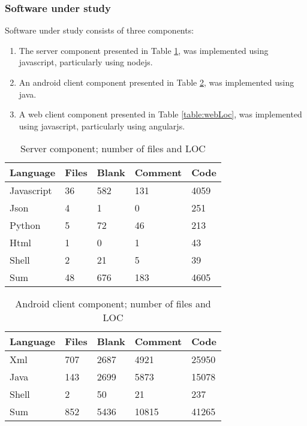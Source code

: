 \documentclass[english,12pt,a4paper,pdftex,sci,utf8]{aaltothesis}
\begin{document}
\subsubsection*{Software under study} \label{software}
Software under study consists of three components:

\begin{enumerate}[label=\textbf{C\arabic*}]
\item The server component presented in Table \ref{table:serverLoc}, was implemented using javascript, particularly using nodejs.

\item An android client component presented in Table \ref{table:androidLoc}, was implemented using java.
    
\item A web client component presented in Table \ref{table:webLoc}, was implemented using javascript, particularly using angularjs.
\end{enumerate}

\begin{table}[ht!]
\centering
\caption{Server component; number of files and LOC}
\label{table:serverLoc}
    \begin{tabular}{ |p{3cm} p{2cm} p{2cm} p{2cm} p{2cm}|  }
     \hline
     Language       &Files  &Blank  &Comment    &Code\\
     \hline
     \hline
     Javascript     &36     &582    &131        &4059\\
     Json           &4      &1      &0          &251\\
     Python         &5      &72     &46         &213\\
     Html           &1      &0      &1          &43\\
     Shell          &2      &21     &5          &39\\
     \hline\hline
     Sum            &48     &676    &183        &4605\\
     \hline
    \end{tabular}
\end{table}

\begin{table}[ht!]
\centering
\caption{Android client component; number of files and LOC}
\label{table:androidLoc}
    \begin{tabular}{ |p{3cm} p{2cm} p{2cm} p{2cm} p{2cm}|  }
     \hline
     Language       &Files  &Blank  &Comment    &Code\\
     \hline\hline
     Xml            &707    &2687   &4921       &25950\\
     Java           &143    &2699   &5873       &15078\\
     Shell          &2      &50     &21         &237\\
     \hline\hline
     Sum            &852    &5436   &10815      &41265\\
     \hline
    \end{tabular}
\end{table}
\end{document}
